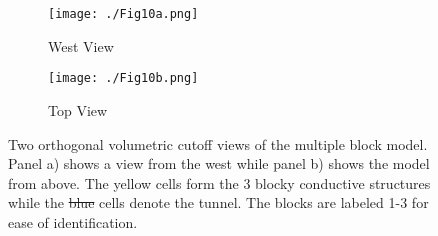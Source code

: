 \documentclass[preprint,authoryear,12pt]{elsarticle}
\providecommand{\DIFaddtex}[1]{{\protect\color{blue}\uwave{#1}}} %
\providecommand{\DIFdeltex}[1]{{\protect\color{red}\sout{#1}}}                      %
\providecommand{\DIFdelbegin}{} %
\providecommand{\DIFaddFL}[1]{\DIFadd{#1}} %
\providecommand{\DIFdelFL}[1]{\DIFdel{#1}} %
\providecommand{\DIFaddbeginFL}{} %
\providecommand{\DIFaddendFL}{} %
\providecommand{\DIFdelbeginFL}{} %
\providecommand{\DIFdelendFL}{} %
\providecommand{\DIFadd}[1]{\texorpdfstring{\DIFaddtex{#1}}{#1}} %
\providecommand{\DIFdel}[1]{\texorpdfstring{\DIFdeltex{#1}}{}} %
\begin{document}
\begin{figure}[htp]{}
   \begin{center}
      \begin{subfigure}{0.54\linewidth}
         \DIFdelbeginFL %
\DIFdelendFL \DIFaddbeginFL {}
         \texttt{[image: ./Fig10a.png]}
         \DIFaddendFL \caption{West View}
         \label{fig:StraightTunnel_MultiBlk_TrueMod_West}
      \end{subfigure}
      \hspace{-2.5cm}
      \qquad
      \begin{subfigure}{0.54\linewidth}
         \DIFdelbeginFL %
\DIFdelendFL \DIFaddbeginFL \texttt{[image: ./Fig10b.png]}
         \DIFaddendFL \caption{Top View}
         \label{fig:StraightTunnel_MultiBlk_TrueMod_Top}
      \end{subfigure}
   \end{center}
\vspace{-0.4cm}
\caption{Two orthogonal volumetric cutoff views of the multiple block model. Panel a) shows a view from the west while panel b) shows the model from above. The yellow cells form the 3 blocky conductive structures while the \DIFdelbeginFL \DIFdelFL{blue }\DIFdelendFL \DIFaddbeginFL \DIFaddFL{dark purple }\DIFaddendFL cells denote the tunnel. The blocks are labeled 1-3 for ease of identification.}
\label{fig:StraightTunnel_MultiBlk_TrueMod}
\end{figure}


\DIFdelbegin %
\end{document}
